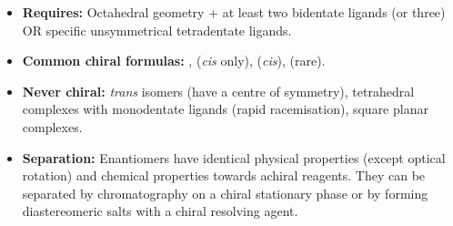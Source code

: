 \documentclass[11pt]{article}
\begin{document}
\begin{aretenir}
\begin{itemize}
\item \textbf{Requires:} Octahedral geometry + at least two bidentate ligands (or three) OR specific unsymmetrical tetradentate ligands.
\item \textbf{Common chiral formulas:} \ce{[M(AA)3]}, \ce{[M(AA)2B2]} (\textit{cis} only), \ce{[M(AA)2BC]} (\textit{cis}), \ce{[M(ABCD)EF]} (rare).
\item \textbf{Never chiral:} \textit{trans} isomers (have a centre of symmetry), tetrahedral complexes with monodentate ligands (rapid racemisation), square planar complexes.
\item \textbf{Separation:} Enantiomers have identical physical properties (except optical rotation) and chemical properties towards achiral reagents. They can be separated by chromatography on a chiral stationary phase or by forming diastereomeric salts with a chiral resolving agent.
\end{itemize}
\end{aretenir}
\end{document}

